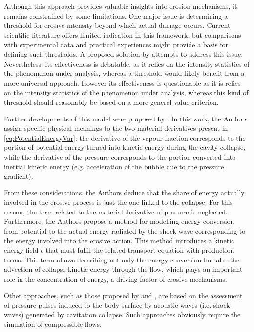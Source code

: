 Although this approach provides valuable insights into erosion mechanisms, it remains constrained by some limitations. One major issue is determining a threshold for erosive intensity beyond which actual damage occurs. Current scientific literature offers limited indication in this framework, but comparisons with experimental data and practical experiences might provide a basis for defining such thresholds. 
A proposed solution by \cite{Usta2019} attempts to address this issue. Nevertheless, its effectiveness is debatable, as it relies on the intensity statistics of the phenomenon under analysis, whereas a threshold would likely benefit from a more universal approach. However its effectiveness is questionable as it is relies on the intensity statistics of the phenomenon under analysis, whereas this kind of threshold should reasonably  be based on a more general value criterion.

Further developments of this model were proposed by \cite{Melissaris2020}. In this work, the Authors assign specific physical meanings to the two material derivatives present in \ref{eq:PotentialEnergyVar}: the derivative of the vapour fraction corresponds to the portion of potential energy turned into kinetic energy during the cavity collapse, while the derivative of the pressure corresponds to the portion converted into inertial kinetic energy (e.g. acceleration of the bubble due to the pressure gradient). 

From these considerations, the Authors deduce that the share of energy actually involved in the erosive process is just the one linked to the collapse. For this reason, the term related to the material derivative of pressure is neglected. 
Furthermore, the Authors propose a method for modelling energy conversion from potential to the actual energy radiated by the shock-wave corresponding to the energy involved into the erosive action. 
This method introduces a kinetic energy field $\epsilon$ that must fulfil the related transport equation with production terms. This term allows describing not only the energy conversion but also the advection of collapse kinetic energy through the flow, which plays an important role in the concentration of energy, a driving factor of erosive mechanisms.

Other approaches, such as those proposed by \cite{Arabnejad2020} and \cite{Schmidt2008}, are based on the assessment of pressure pulses induced to the body surface by acoustic waves (i.e. shock-waves) generated by cavitation collapse. Such approaches obviously require the simulation of compressible flows.

